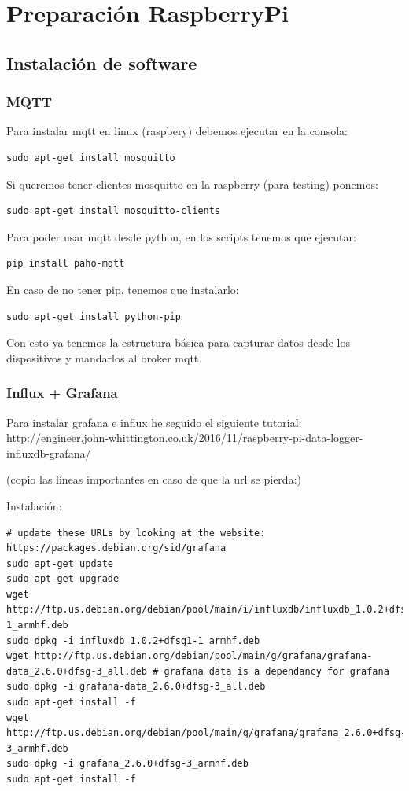 \documentclass[12pt, a4paper, oneside, titlepage]{article}
\begin{document}
\section{Preparación RaspberryPi}

\subsection{Instalación de software}

\subsubsection{MQTT}

Para instalar mqtt en linux (raspbery) debemos ejecutar en la consola:
\begin{lstlisting}[frame=single]
sudo apt-get install mosquitto
 \end{lstlisting}
Si queremos tener clientes mosquitto en la raspberry (para testing) ponemos:
\begin{lstlisting}[frame=single]
sudo apt-get install mosquitto-clients
 \end{lstlisting}
 
Para poder usar mqtt desde python, en los scripts tenemos que ejecutar:
\begin{lstlisting}[frame=single]
pip install paho-mqtt
\end{lstlisting}
 
 En caso de no tener pip, tenemos que instalarlo:
\begin{lstlisting}[frame=single]
 sudo apt-get install python-pip
 \end{lstlisting}

Con esto ya tenemos la estructura básica para capturar datos desde los dispositivos y mandarlos al broker mqtt.

\subsubsection{Influx + Grafana}

Para instalar grafana e influx he seguido el siguiente tutorial:
http://engineer.john-whittington.co.uk/2016/11/raspberry-pi-data-logger-influxdb-grafana/

(copio las líneas importantes en caso de que la url se pierda:)
 
Instalación:
\begin{lstlisting}[frame=single]
# update these URLs by looking at the website: https://packages.debian.org/sid/grafana
sudo apt-get update
sudo apt-get upgrade
wget http://ftp.us.debian.org/debian/pool/main/i/influxdb/influxdb_1.0.2+dfsg1-1_armhf.deb
sudo dpkg -i influxdb_1.0.2+dfsg1-1_armhf.deb
wget http://ftp.us.debian.org/debian/pool/main/g/grafana/grafana-data_2.6.0+dfsg-3_all.deb # grafana data is a dependancy for grafana
sudo dpkg -i grafana-data_2.6.0+dfsg-3_all.deb
sudo apt-get install -f
wget http://ftp.us.debian.org/debian/pool/main/g/grafana/grafana_2.6.0+dfsg-3_armhf.deb
sudo dpkg -i grafana_2.6.0+dfsg-3_armhf.deb
sudo apt-get install -f
 
 \end{lstlisting}
\end{document}
